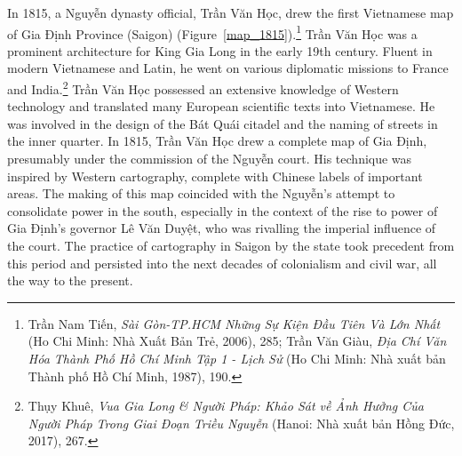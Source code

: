 In 1815, a Nguyễn dynasty official, Trần Văn Học, drew the first Vietnamese map of Gia Định Province (Saigon) (Figure~\ref{map_1815}).\footnote{Trần Nam Tiến, \textit{Sài Gòn-TP.HCM Những Sự Kiện Đầu Tiên Và Lớn Nhất} (Ho Chi Minh: Nhà Xuất Bản Trẻ, 2006), 285; Trần Văn Giàu, \textit{Địa Chí Văn Hóa Thành Phố Hồ Chí Minh Tập 1 - Lịch Sử} (Ho Chi Minh: Nhà xuất bản Thành phố Hồ Chí Minh, 1987), 190.} Trần Văn Học was a prominent architecture for King Gia Long in the early 19th century. Fluent in modern Vietnamese and Latin, he went on various diplomatic missions to France and India.\footnote{\vi Thụy Khuê, \textit{Vua Gia Long \& Người Pháp: Khảo Sát về Ảnh Hưởng Của Người Pháp Trong Giai Đoạn Triều Nguyễn} (Hanoi: Nhà xuất bản Hồng Đức, 2017), 267.} Trần Văn Học possessed an extensive knowledge of Western technology and translated many European scientific texts into Vietnamese. He was involved in the design of the Bát Quái citadel and the naming of streets in the inner quarter. In 1815, Trần Văn Học drew a complete map of Gia Định, presumably under the commission of the Nguyễn court. His technique was inspired by Western cartography, complete with Chinese labels of important areas. The making of this map coincided with the Nguyễn’s attempt to consolidate power in the south, especially in the context of the rise to power of Gia Định’s governor Lê Văn Duyệt, who was rivalling the imperial influence of the court. The practice of cartography in Saigon by the state took precedent from this period and persisted into the next decades of colonialism and civil war, all the way to the present.
\en

\begin{figure}[!ht]
\end{figure}

